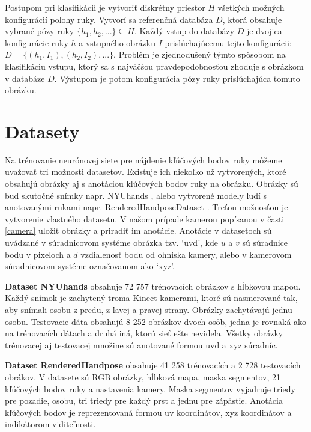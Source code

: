 Postupom pri klasifikácii je vytvoriť diskrétny priestor $H$ všetkých možných konfigurácií polohy ruky. Vytvorí sa referenčná databáza $D$, ktorá obsahuje vybrané pózy ruky $\{h_1,h_2,...\} \subseteq H$. Každý vstup do databázy $D$ je dvojica konfigurácie ruky $h$ a vstupného obrázku $I$ prislúchajúcemu tejto konfigurácii: $D = \{(h_1,I_1), (h_2,I_2), ...\}$. Problém je zjednodušený týmto spôsobom na klasifikáciu vstupu, ktorý sa s najväčšou pravdepodobnosťou zhoduje s obrázkom v databáze $D$. Výstupom je potom konfigurácia pózy ruky prislúchajúca tomuto obrázku. \cite{Oikonomidis}

\section{Datasety}\label{datasets}
Na trénovanie neurónovej siete pre nájdenie kľúčových bodov ruky môžeme uvažovať tri možnosti datasetov. Existuje ich niekoľko už vytvorených, ktoré obsahujú obrázky aj s anotáciou klúčových bodov ruky na obrázku. Obrázky sú buď skutočné snímky napr. NYUhands \cite{tompson14tog}, alebo vytvorené modely ľudí s anotovanými rukami napr. RenderedHandposeDataset \cite{zb2017hand}. Treťou možnosťou je vytvorenie vlastného datasetu. V našom prípade kamerou popísanou v časti \ref{camera} uložiť obrázky a priradiť im anotácie. Anotácie v datasetoch sú uvádzané v súradnicovom systéme obrázka tzv. `uvd', kde $u$ a $v$ sú súradnice bodu v pixeloch a $d$ vzdialenosť bodu od ohniska kamery, alebo v kamerovom súradnicovom systéme označovanom ako `xyz'.

\textbf{Dataset NYUhands} \cite{tompson14tog} obsahuje 72 757 trénovacích obrázkov s hĺbkovou mapou. Každý snímok je zachytený troma Kinect kamerami, ktoré sú nasmerované tak, aby snímali osobu z predu, z ľavej a pravej strany. Obrázky zachytávajú jednu osobu. Testovacie dáta obsahujú 8 252 obrázkov dvoch osôb, jedna je rovnaká ako na trénovacích dátach a druhá iná, ktorú sieť ešte nevidela. Všetky obrázky trénovacej aj testovacej množine sú anotované formou uvd a xyz súradníc.

\textbf{Dataset RenderedHandpose} \cite{zb2017hand} obsahuje 41 258 trénovacích a 2 728 testovacích obrákov. V datasete sú RGB obrázky, hĺbková mapa, maska segmentov, 21 kľúčových bodov ruky a nastavenia kamery. Maska segmentov vyjadruje triedy pre pozadie, osobu, tri triedy pre každý prst a jednu pre zápästie. Anotácia kľúčových bodov je reprezentovaná formou uv koordinátov, xyz koordinátov a indikátorom viditeľnosti.

